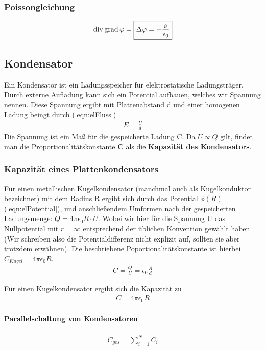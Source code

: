 \subsubsection{Poissongleichung}\begin{align}\label{eqn:Poissongleichung}
\mathrm{div\,} \mathrm{grad\,} \varphi = \boxed{\Delta \varphi = -\frac{\varrho}{\epsilon_0}}
\end{align}
\subsection{Kondensator}
Ein Kondensator ist ein Ladungsspeicher für elektrostatische Ladungsträger.
Durch externe Aufladung kann sich ein Potential aufbauen, welches wir Spannung nennen.
Diese Spannung ergibt mit  Plattenabstand d und einer homogenen Ladung beingt durch (\ref{eqn:elFluss})\begin{align}
E = \frac{U}{d}
\end{align}Die Spannung ist ein Maß für die gespeicherte Ladung C. Da $U \propto Q$ gilt, findet man die Proportionalitätskonstante \textbf{C} als die \textbf{Kapazität des Kondensators}.

\subsubsection{Kapazität eines Plattenkondensators}
Für einen metallischen Kugelkondensator (manchmal auch als Kugelkonduktor bezeichnet) mit dem Radius R ergibt sich durch das Potential $\phi \left(R\right)$(\ref{eqn:elPotential}), und anschließendem Umformen nach der gespeicherten Ladungsmenge: $Q = 4\pi \epsilon_0 R \cdot U$. Wobei wir hier für die Spannung U das Nullpotential  mit $r = \infty$ entsprechend der üblichen Konvention gewählt haben (Wir schreiben also die Potentialdifferenz nicht explizit auf, sollten sie aber trotzdem erwähnen). Die beschriebene Poportionalitätskonstante ist hierbei $C_{Kugel} = 4\pi \epsilon_0 R$. 
\begin{align} \label{eqn:Kapazität Plattenkondensator}
\boxed{C = \frac{Q}{U} = \epsilon_0 \frac{A}{d}}
\end{align}

Für einen Kugelkondensator ergibt sich die Kapazität zu
\begin{align} \label{eqn:Kapazität Plattenkondensator}
C= 4 \pi \epsilon_0 R
\end{align}


\paragraph{Parallelschaltung von Kondensatoren}
\begin{align} \label{eqn:gesKapazität Parallelschaltung}
\boxed{C_{ges} = \sum \limits_{i=1}^{N} C_i}
\end{align}

